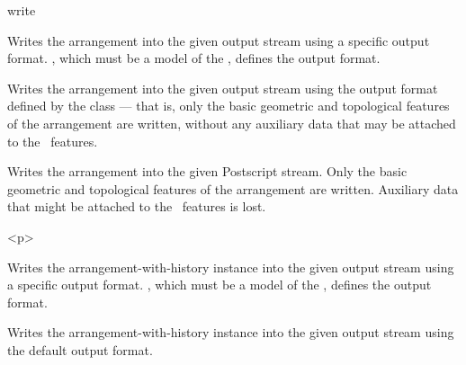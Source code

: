 
\ccRefPageBegin
\begin{ccRefFunction}{write}


   {Writes the arrangement  into the given output stream using a specific
    output format. , which must be a model of the
    , defines the output format.}

   {Writes the arrangement  into the given output stream using the
    output format defined by the  class --- that is,
    only the basic geometric and topological features of the arrangement are
    written, without any auxiliary data that may be attached to the \dcel\ features.}

   {Writes the arrangement  into the given Postscript stream.
    Only the basic geometric and topological features of the arrangement are
    written. Auxiliary data that might be attached to the \dcel\ features is
    lost.}

\begin{ccHtmlOnly}<p>\end{ccHtmlOnly}

   {Writes the arrangement-with-history instance  into the given
    output stream using a specific output format. , which must
    be a model of the , defines the output
    format.}

   {Writes the arrangement-with-history instance  into the given
    output stream using the default output format.}

\ccSeeAlso

\end{ccRefFunction}
\ccRefPageEnd
